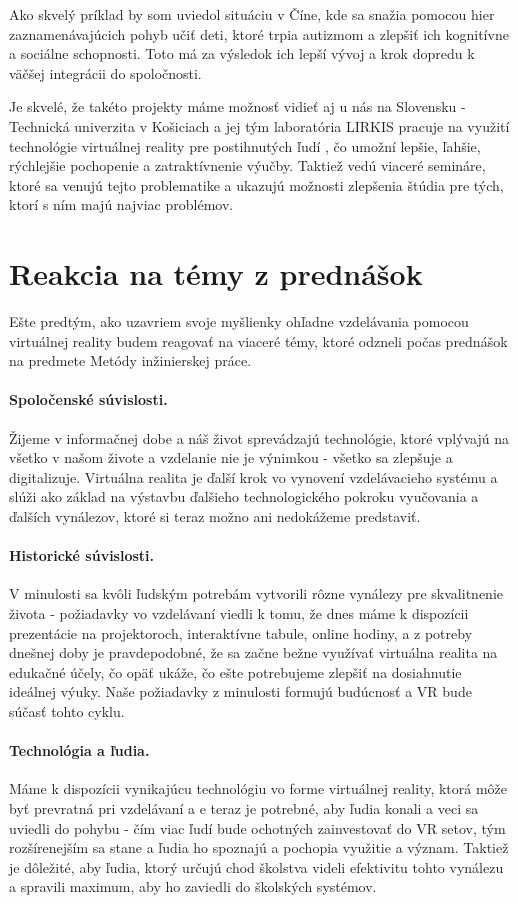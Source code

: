 \documentclass[10pt,twoside,slovak,a4paper]{article}
\begin{document}
Ako skvelý príklad by som uviedol situáciu v Číne,\cite{hry} kde sa snažia pomocou hier zaznamenávajúcich pohyb učiť deti, ktoré trpia autizmom a zlepšiť ich kognitívne a sociálne schopnosti. Toto má za výsledok ich lepší vývoj a krok dopredu k väčšej integrácii do spoločnosti.

Je skvelé, že takéto projekty máme možnosť vidieť aj u nás na Slovensku - Technická univerzita v Košiciach a jej tým laboratória LIRKIS pracuje na využití technológie virtuálnej reality pre postihnutých ľudí \cite{svk}, čo umožní lepšie, ľahšie, rýchlejšie pochopenie a zatraktívnenie výučby. Taktiež vedú viaceré semináre, ktoré sa venujú tejto problematike a ukazujú možnosti zlepšenia štúdia pre tých, ktorí s ním majú najviac problémov.

\section{Reakcia na témy z prednášok} \label{piata}
Ešte predtým, ako uzavriem svoje myšlienky ohľadne vzdelávania pomocou virtuálnej reality budem reagovať na viaceré témy, ktoré odzneli počas prednášok na predmete Metódy inžinierskej práce.

\paragraph{Spoločenské súvislosti.}
Žijeme v informačnej dobe a náš život sprevádzajú technológie, ktoré vplývajú na všetko v našom živote a vzdelanie nie je výnimkou - všetko sa zlepšuje a digitalizuje. Virtuálna realita je ďalší krok vo vynovení vzdelávacieho systému a slúži ako základ na výstavbu ďalšieho technologického pokroku vyučovania a ďalších vynálezov, ktoré si teraz možno ani nedokážeme predstaviť.
\paragraph{Historické súvislosti.}
V minulosti sa kvôli ľudským potrebám vytvorili rôzne vynálezy pre skvalitnenie života - požiadavky vo vzdelávaní viedli k tomu, že dnes máme k dispozícii prezentácie na projektoroch, interaktívne tabule, online hodiny, a z potreby dnešnej doby je pravdepodobné, že sa začne bežne využívať virtuálna realita na edukačné účely, čo opäť ukáže, čo ešte potrebujeme zlepšiť na dosiahnutie ideálnej výuky. Naše požiadavky z minulosti formujú budúcnosť a VR bude súčasť tohto cyklu. 
\paragraph{Technológia a ľudia.}
Máme k dispozícii vynikajúcu technológiu vo forme virtuálnej reality, ktorá môže byť prevratná pri vzdelávaní a e teraz je potrebné, aby ľudia konali a veci sa uviedli do pohybu - čím viac ľudí bude ochotných zainvestovať do VR setov, tým rozšírenejším sa stane a ľudia ho spoznajú a pochopia využitie a význam. Taktiež je dôležité, aby ľudia, ktorý určujú chod školstva videli efektivitu tohto vynálezu a spravili maximum, aby ho zaviedli do školských systémov.
\end{document}

